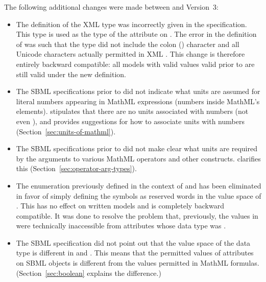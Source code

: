 The following additional changes were made between \sbmltwotwo and
Version~3:
\begin{itemize}

\item The definition of the XML type  was incorrectly
  given in the \sbmltwotwo specification.  This type is used as
  the type of the attribute  on \SBase.  The error
  in the definition of  was such that the type did
  not include the colon (\token{:}) character and all Unicode
  characters actually permitted in XML .  This change
  is therefore entirely backward compatible: all models with valid
   values valid prior to \sbmltwothree are still
  valid under the new definition.

\item The SBML specifications prior to \sbmltwothree did not
  indicate what units are assumed for literal numbers appearing in
  MathML expressions (\ie numbers inside MathML's 
  elements).  \sbmltwothree stipulates that there are no units
  associated with numbers (not even ), and
  provides suggestions for how to associate units with numbers
  (Section~\ref{sec:units-of-mathml}).

\item The SBML specifications prior to \sbmltwothree did not make
  clear what units are required by the arguments to various MathML
  operators and other constructs.  \sbmltwothree clarifies this
  (Section~\ref{sec:operator-arg-types}).

\item The  enumeration previously defined in
  the context of \Unit and \UnitDefinition has been eliminated in
  favor of simply defining the symbols as reserved words in the
  value space of .  This has no effect on
  written models and is completely backward compatible.  It was
  done to resolve the problem that, previously, the values in
   were technically inaccessible from attributes
  whose data type was .

\item The SBML specification did not point out that the value
  space of the data type  is different in
  \mathmltwo and \xmlschemaone.  This means that the permitted
  values of attributes on SBML objects is different from the
  values permitted in MathML formulas.  (Section~\ref{sec:boolean}
  explains the difference.)


\end{itemize}
